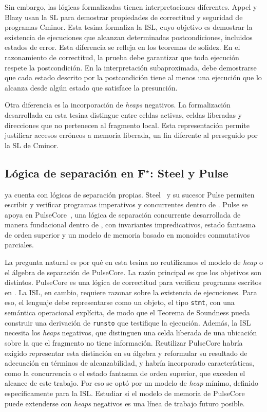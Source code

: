 \documentclass[a4paper,	11pt]{report}
\begin{document}
Sin embargo,
las lógicas formalizadas tienen interpretaciones diferentes.
Appel y Blazy usan la SL para demostrar propiedades de correctitud y seguridad de programas Cminor.
Esta tesina formaliza la ISL,
cuyo objetivo es demostrar la existencia de ejecuciones que alcanzan determinadas postcondiciones, incluidos estados de error.
Esta diferencia se refleja en los teoremas de solidez.
En el razonamiento de correctitud,
la prueba debe garantizar que toda ejecución respete la postcondición.
En la interpretación subaproximada,
debe demostrarse que cada estado descrito por la postcondición tiene al menos una ejecución que lo alcanza desde algún estado que satisface la presunción.

Otra diferencia es la incorporación de \emph{heaps} negativos.
La formalización desarrollada en esta tesina distingue entre celdas activas,
celdas liberadas y direcciones que no pertenecen al fragmento local.
Esta representación permite justificar accesos erróneos a memoria liberada,
un fin diferente al perseguido por la SL de Cminor.

\subsection*{Lógica de separación en F$^\star$: Steel y Pulse}
\fstar{} ya cuenta con lógicas de separación propias.
Steel~\citep{steel} y su sucesor Pulse permiten escribir y verificar programas imperativos y concurrentes dentro de \fstar{}.
Pulse se apoya en PulseCore~\citep{pulsecore},
una lógica de separación concurrente desarrollada de manera fundacional dentro de \fstar{},
con invariantes impredicativos,
estado fantasma de orden superior y un modelo de memoria basado en monoides conmutativos parciales.

La pregunta natural es por qué en esta tesina no reutilizamos el modelo de \emph{heap} o el álgebra de separación de PulseCore.
La razón principal es que los objetivos son distintos.
PulseCore es una lógica de correctitud para verificar programas escritos en \fstar{}.
La ISL,
en cambio,
requiere razonar sobre la existencia de ejecuciones.
Para eso,
el lenguaje debe representarse como un objeto,
el tipo \lstinline|stmt|,
con una semántica operacional explícita,
de modo que el Teorema de Soundness pueda construir una derivación de \lstinline|runsto| que testifique la ejecución.
Además,
la ISL necesita los \emph{heaps} negativos,
que distinguen una celda liberada de una ubicación sobre la que el fragmento no tiene información.
Reutilizar PulseCore habría exigido representar esta distinción en su álgebra y reformular su resultado de adecuación en términos de alcanzabilidad,
y habría incorporado características,
como la concurrencia o el estado fantasma de orden superior,
que exceden el alcance de este trabajo.
Por eso se optó por un modelo de \emph{heap} mínimo,
definido específicamente para la ISL.
Estudiar si el modelo de memoria de PulseCore puede extenderse con \emph{heaps}
negativos es una línea de trabajo futuro posible.
\end{document}
